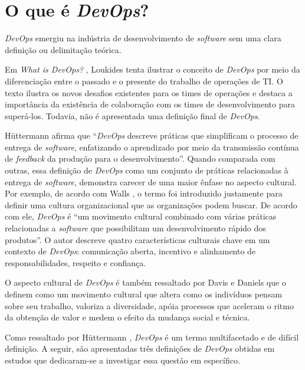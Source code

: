 \section{O que é \textit{DevOps}?}\label{secao_definicao_devops}

\textit{DevOps} emergiu na indústria de desenvolvimento de \textit{software}
sem uma clara definição ou delimitação teórica.

Em \textit{What is DevOps?} \cite{what_is_devops}, Loukides tenta ilustrar o
conceito de \textit{DevOps} por meio da diferenciação entre o passado e o
presente do trabalho de operações de \acrshort{TI}. O texto ilustra os novos
desafios existentes para os times de operações e destaca a importância da
existência de colaboração com os times de desenvolvimento para superá-los.
Todavia, não é apresentada uma definição final de \textit{DevOps}.

H\"uttermann afirma que ``\textit{DevOps} descreve práticas que simplificam o
processo de entrega de \textit{software}, enfatizando o aprendizado por meio da
transmissão contínua de \textit{feedback} da produção para o desenvolvimento''.
Quando comparada com outras, essa definição de \textit{DevOps} como um conjunto
de práticas relacionadas à entrega de \textit{software}, demonstra carecer
de uma maior ênfase no aspecto cultural. Por exemplo, de acordo com
Walls \cite{building_devops_culture}, o termo foi introduzido justamente para
definir uma cultura organizacional que as organizações podem buscar. De acordo
com ele, \textit{DevOps} é ``um movimento cultural combinado com várias
práticas relacionadas a \textit{software} que possibilitam um desenvolvimento
rápido dos produtos''. O autor descreve quatro características culturais chave em um
contexto de \textit{DevOps}: comunicação aberta, incentivo e alinhamento de
responsabilidades, respeito e confiança.

O aspecto cultural de \textit{DevOps} é também ressaltado por Davis e Daniels
\cite{effective_devops} que o definem como um movimento cultural que altera
como os indivíduos pensam sobre seu trabalho, valoriza a diversidade, apóia
processos que aceleram o ritmo da obtenção de valor e medem o efeito da mudança
social e técnica.

Como ressaltado por H\"uttermann \cite{devops_for_developers}, \textit{DevOps}
é um termo multifacetado e de difícil definição. A seguir, são apresentadas
três definições de \textit{DevOps} obtidas em estudos que dedicaram-se a
investigar essa questão em específico.

